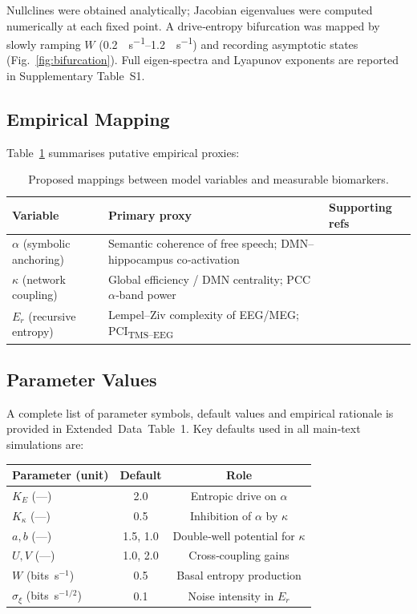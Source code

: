 Nullclines were obtained analytically; Jacobian eigenvalues were computed numerically at each fixed point.  
A drive‑entropy bifurcation was mapped by slowly ramping $W$ (\SIrange{0.2}{1.2}{\bits\per\second}) and recording asymptotic states (Fig.~\ref{fig:bifurcation}).  
Full eigen‑spectra and Lyapunov exponents are reported in Supplementary Table S1.

\subsection*{Empirical Mapping}

Table \ref{tab:empirical} summarises putative empirical proxies:

\begin{table}[ht]
\centering
\caption{Proposed mappings between model variables and measurable biomarkers.}
\label{tab:empirical}
\begin{tabular}{@{}lll@{}}
\toprule
Variable & Primary proxy & Supporting refs \\
\midrule
$\alpha$ (symbolic anchoring) & Semantic coherence of free speech; DMN–hippocampus co‑activation & \cite{Bedi2015speech,Sporns2013network} \\
$\kappa$ (network coupling)   & Global efficiency / DMN centrality; PCC $\alpha$‑band power          & \cite{Bassett2017network,CarhartHarris2014} \\
$E_r$ (recursive entropy)     & Lempel–Ziv complexity of EEG/MEG; PCI\textsubscript{TMS–EEG}        & \cite{Schartner2017evidence,CarhartHarris2014} \\
\bottomrule
\end{tabular}
\end{table}

\subsection*{Parameter Values}

A complete list of parameter symbols, default values and empirical rationale is provided in Extended Data Table 1.  Key defaults used in all main‑text simulations are:

\begin{center}
\begin{tabular}{@{}lcc@{}}
\toprule
Parameter (unit) & Default & Role \\
\midrule
$K_E$ (—)       & 2.0 & Entropic drive on $\alpha$ \\
$K_{\kappa}$ (—)& 0.5 & Inhibition of $\alpha$ by $\kappa$ \\
$a,b$ (—)       & 1.5, 1.0 & Double‑well potential for $\kappa$ \\
$U,V$ (—)       & 1.0, 2.0 & Cross‑coupling gains \\
$W$ (bits s$^{-1}$) & 0.5 & Basal entropy production \\
$\sigma_\xi$ (bits s$^{-1/2}$) & 0.1 & Noise intensity in $E_r$ \\
\bottomrule
\end{tabular}
\end{center}

